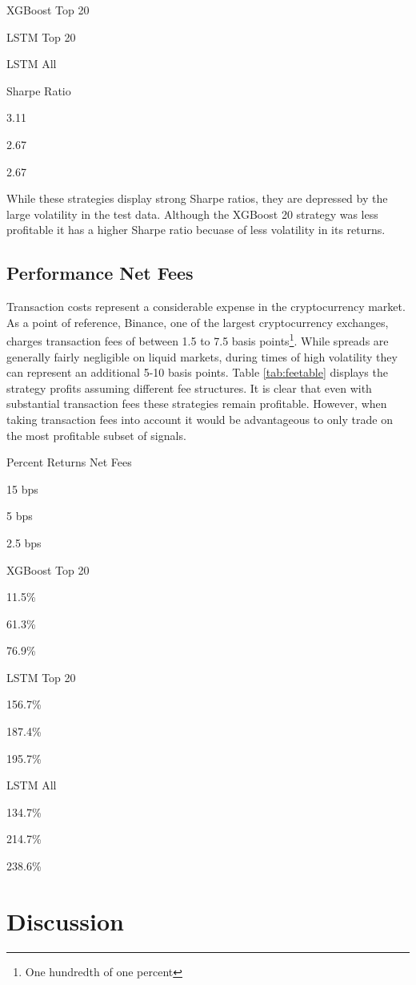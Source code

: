 \documentclass[12pt,twoside]{dukestatscithesis}
\begin{document}
XGBoost Top 20

LSTM Top 20

LSTM All

Sharpe Ratio

3.11

2.67

2.67

While these strategies display strong Sharpe ratios, they are depressed
by the large volatility in the test data. Although the XGBoost 20
strategy was less profitable it has a higher Sharpe ratio becuase of
less volatility in its returns.

\section{Performance Net Fees}\label{performance-net-fees}

Transaction costs represent a considerable expense in the cryptocurrency
market. As a point of reference, Binance, one of the largest
cryptocurrency exchanges, charges transaction fees of between 1.5 to 7.5
basis points\footnote{One hundredth of one percent}. While spreads are
generally fairly negligible on liquid markets, during times of high
volatility they can represent an additional 5-10 basis points. Table
\ref{tab:feetable} displays the strategy profits assuming different fee
structures. It is clear that even with substantial transaction fees
these strategies remain profitable. However, when taking transaction
fees into account it would be advantageous to only trade on the most
profitable subset of signals.

\label{tab:feetable}Percent Returns Net Fees

15 bps

5 bps

2.5 bps

XGBoost Top 20

11.5\%

61.3\%

76.9\%

LSTM Top 20

156.7\%

187.4\%

195.7\%

LSTM All

134.7\%

214.7\%

238.6\%

\chapter*{Discussion}\label{discussion}
\end{document}
